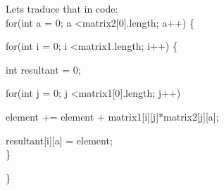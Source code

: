 \documentclass{article}
\begin{document}
Lets traduce that in code:\\


for(int a = 0; a \textless matrix2[0].length; a++) \{

\quad \quad \quad for(int i = 0; i \textless matrix1.length; i++) \{

\quad \quad \quad \quad \quad \quad int resultant = 0;

\quad \quad \quad \quad \quad \quad for(int j = 0; j \textless matrix1[0].length; j++)

\quad \quad \quad \quad \quad \quad \quad \quad \quad element += element + matrix1[i][j]*matrix2[j][a];

\quad \quad \quad \quad \quad \quad resultant[i][a] = element;\\

\quad \quad \quad \}

\}
\end{document}
